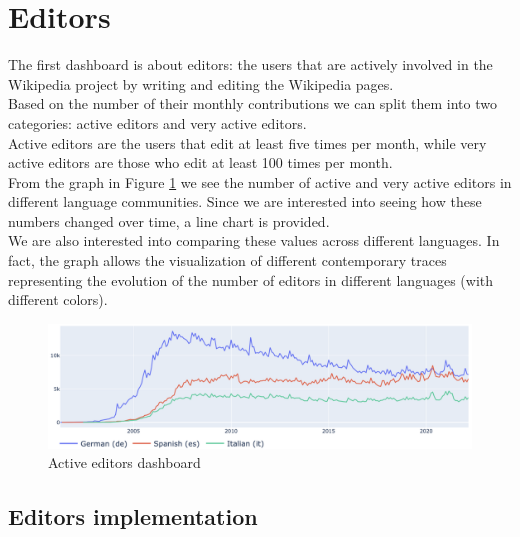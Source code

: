 \section{Editors}
\label{sec:editors}
The first dashboard is about editors: the users that are actively involved in the Wikipedia project by writing and editing the Wikipedia pages.\\
Based on the number of their monthly contributions we can split them into two categories: active editors and very active editors.\\
Active editors are the users that edit at least five times per month, while very active editors are those who edit at least 100 times per month.\\
From the graph in Figure \ref{fig:editors} we see the number of active and very active editors in different language communities. Since we are interested into seeing how these numbers changed over time, a line chart is provided.\\
We are also interested into comparing these values across different languages. In fact, the graph allows the visualization of different contemporary traces representing the evolution of the number of editors in different languages (with different colors).

\begin{figure}[h]
    \centering
    \includegraphics[width=470px]{img/active_editors.png}
    \caption{Active editors dashboard}
    \label{fig:editors}
\end{figure}


\subsection{Editors implementation}
\label{sec:editors_callback}

